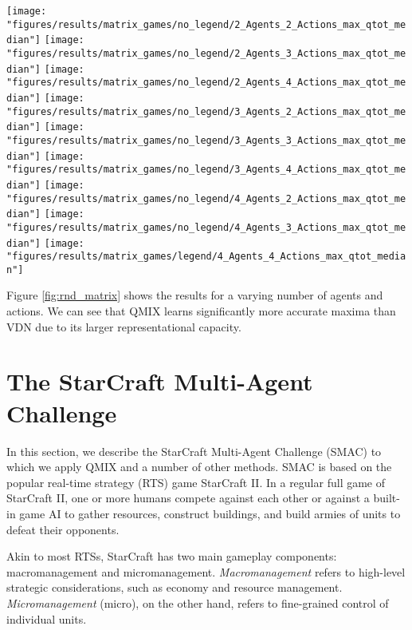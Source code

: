 \documentclass[twoside,11pt]{article}
\begin{document}
\begin{figure*}[h!]
	\centering
	\texttt{[image: "figures/results/matrix\_games/no\_legend/2\_Agents\_2\_Actions\_max\_qtot\_median"]}
	\texttt{[image: "figures/results/matrix\_games/no\_legend/2\_Agents\_3\_Actions\_max\_qtot\_median"]}
	\texttt{[image: "figures/results/matrix\_games/no\_legend/2\_Agents\_4\_Actions\_max\_qtot\_median"]}
	\texttt{[image: "figures/results/matrix\_games/no\_legend/3\_Agents\_2\_Actions\_max\_qtot\_median"]}
	\texttt{[image: "figures/results/matrix\_games/no\_legend/3\_Agents\_3\_Actions\_max\_qtot\_median"]}
	\texttt{[image: "figures/results/matrix\_games/no\_legend/3\_Agents\_4\_Actions\_max\_qtot\_median"]}
	\texttt{[image: "figures/results/matrix\_games/no\_legend/4\_Agents\_2\_Actions\_max\_qtot\_median"]}
	\texttt{[image: "figures/results/matrix\_games/no\_legend/4\_Agents\_3\_Actions\_max\_qtot\_median"]}
	\texttt{[image: "figures/results/matrix\_games/legend/4\_Agents\_4\_Actions\_max\_qtot\_median"]}
	\caption{The median $\max_{\mathbf{u}} Q_{tot}(s, \mathbf{u})$ for $\{2,3,4\}$ agents with $\{2,3,4\}$ actions across 10 runs for VDN and QMIX. 25\%-75\% quartile is shown shaded. The dashed line at 10 indicates the correct value.}
	\label{fig:rnd_matrix}
\end{figure*}

Figure \ref{fig:rnd_matrix} shows the results for a varying number of agents and actions. 
We can see that QMIX learns significantly more accurate maxima than VDN due to its larger representational capacity.  
 \section{The StarCraft Multi-Agent Challenge}
\label{sec:setting}


In this section, we describe the StarCraft Multi-Agent Challenge (SMAC) to which we apply QMIX and a number of other methods.
SMAC is based on the popular real-time strategy (RTS) game StarCraft II.
In a regular full game of StarCraft II, one or more humans compete against each other or against a built-in game AI to gather resources, construct buildings, and build armies of units to defeat their opponents.

Akin to most RTSs, StarCraft has two main gameplay components: macromanagement and micromanagement. \emph{Macromanagement} refers to high-level strategic considerations, such as economy and resource management.
\emph{Micromanagement} (micro), on the other hand, refers to fine-grained control of individual units.
\end{document}

